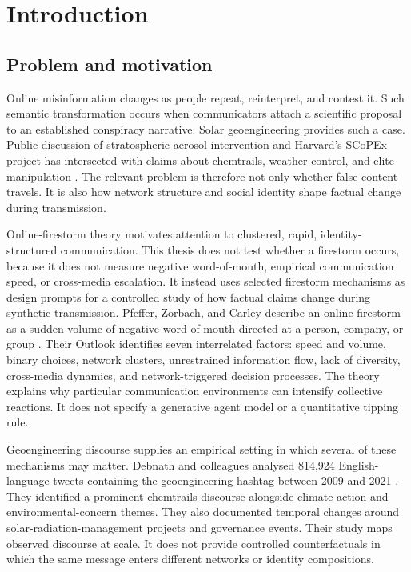 \chapter{Introduction}
\label{chap:introduction}

\section{Problem and motivation}
\label{sec:introduction_problem}

Online misinformation changes as people repeat, reinterpret, and contest it.
Such semantic transformation occurs when communicators attach a scientific proposal to an established conspiracy narrative.
Solar geoengineering provides such a case.
Public discussion of stratospheric aerosol intervention and Harvard's SCoPEx project has intersected with claims about chemtrails, weather control, and elite manipulation \parencite{debnath2023conspiracy}.
The relevant problem is therefore not only whether false content travels.
It is also how network structure and social identity shape factual change during transmission.

Online-firestorm theory motivates attention to clustered, rapid,
identity-structured communication. This thesis does not test whether a
firestorm occurs, because it does not measure negative word-of-mouth,
empirical communication speed, or cross-media escalation. It instead uses
selected firestorm mechanisms as design prompts for a controlled study of how
factual claims change during synthetic transmission.
Pfeffer, Zorbach, and Carley describe an online firestorm as a sudden volume of negative word of mouth directed at a person, company, or group \parencite{pfeffer2014firestorms}.
Their Outlook identifies seven interrelated factors: speed and volume, binary choices, network clusters, unrestrained information flow, lack of diversity, cross-media dynamics, and network-triggered decision processes.
The theory explains why particular communication environments can intensify collective reactions.
It does not specify a generative agent model or a quantitative tipping rule.

Geoengineering discourse supplies an empirical setting in which several of these mechanisms may matter.
Debnath and colleagues analysed 814,924 English-language tweets containing the geoengineering hashtag between 2009 and 2021 \parencite{debnath2023conspiracy}.
They identified a prominent chemtrails discourse alongside climate-action and environmental-concern themes.
They also documented temporal changes around solar-radiation-management projects and governance events.
Their study maps observed discourse at scale.
It does not provide controlled counterfactuals in which the same message enters different networks or identity compositions.

